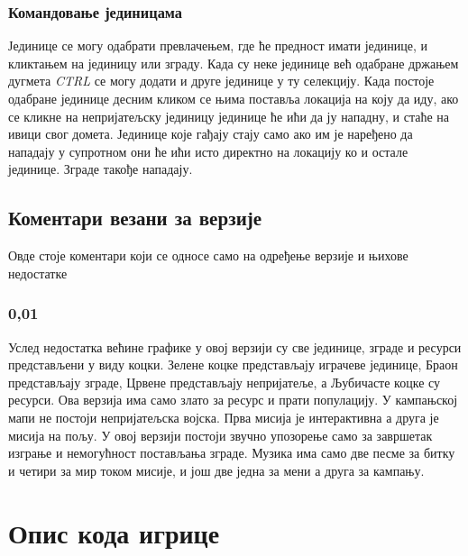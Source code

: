 \documentclass[11pt,a4paper]{report}
\begin{document}
\subsection{Командовање јединицама}
Јединице се могу одабрати превлачењем, где ће предност имати јединице, и кликтањем на јединицу или зграду. Када су неке јединице већ одабране држањем дугмета \emph{CTRL} се могу додати и друге јединице у ту селекцију. Када постоје одабране јединице десним кликом се њима поставља локација на коју да иду, ако се кликне на непријатељску јединицу јединице ће ићи да ју нападну, и  стаће на ивици свог домета. Јединице које гађају стају само ако им је наређено да нападају у супротном они ће ићи исто директно на локацију ко и остале јединице. Зграде такође нападају.

\section{Коментари везани за верзије}
Овде стоје коментари који се односе само на одређење верзије и њихове недостатке

\subsection{0,01}
Услед недостатка већине графике у овој верзији су све јединице, зграде и ресурси представљени у виду коцки. Зелене коцке представљају играчеве јединице, Браон представљају зграде, Црвене представљају непријатеље, а Љубичасте коцке су ресурси. Ова верзија има само злато за ресурс и прати популацију. У кампањској мапи не постоји непријатељска војска. Прва мисија је интерактивна а друга је мисија на пољу. У овој верзији постоји звучно упозорење само за завршетак изграње и немогућност постављања зграде. Музика има само две песме за битку и четири  за мир током мисије, и још две једна за мени а друга за кампању.

\chapter{Опис кода игрице}
\end{document}
